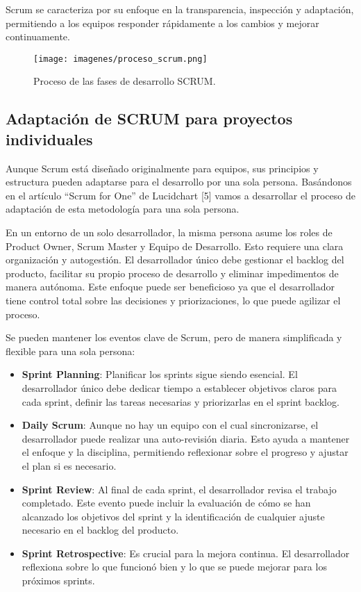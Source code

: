 Scrum se caracteriza por su enfoque en la transparencia, inspección y
adaptación, permitiendo a los equipos responder rápidamente a los cambios y mejorar continuamente.

\begin{figure}[ht!]
  \centering
  \texttt{[image: imagenes/proceso\_scrum.png]}
  \caption{Proceso de las fases de desarrollo SCRUM.}
  \label{Fig.FasesSCRUM}
\end{figure}

\subsection{Adaptación de SCRUM para proyectos individuales}
Aunque Scrum está diseñado originalmente para equipos, sus principios y
estructura pueden adaptarse para el desarrollo por una sola persona. Basándonos en el artículo “Scrum for One” de Lucidchart [5] vamos a desarrollar el proceso de adaptación de esta metodología para una sola persona. 

En un entorno de un solo desarrollador, la misma persona asume los roles de Product Owner, Scrum Master y Equipo de Desarrollo. Esto requiere una clara organización y autogestión. El desarrollador único debe gestionar el backlog del producto, facilitar su propio proceso de desarrollo y eliminar impedimentos de manera autónoma. Este enfoque puede ser beneficioso ya que el desarrollador tiene control total sobre las decisiones y priorizaciones, lo que puede agilizar el proceso. 

Se pueden mantener los eventos clave de Scrum, pero de manera simplificada y flexible para una sola persona:
\begin{itemize}
    
    \item\textbf{Sprint Planning}: Planificar los sprints sigue siendo esencial. El desarrollador único debe dedicar tiempo a establecer objetivos claros para cada sprint, definir las tareas necesarias y priorizarlas en el sprint backlog.
    
    \item\textbf{Daily Scrum}: Aunque no hay un equipo con el cual sincronizarse, el desarrollador puede realizar una auto-revisión diaria. Esto ayuda a mantener el enfoque y la disciplina, permitiendo reflexionar sobre el progreso y ajustar el plan si es necesario.
    
    \item\textbf{Sprint Review}: Al final de cada sprint, el desarrollador revisa el trabajo completado. Este evento puede incluir la evaluación de cómo se han alcanzado los objetivos del sprint y la identificación de cualquier ajuste necesario en el backlog del producto.

    \item\textbf{Sprint Retrospective}: Es crucial para la mejora continua. El desarrollador reflexiona sobre lo que funcionó bien y lo que se puede mejorar para los próximos sprints.
  
\end{itemize}

